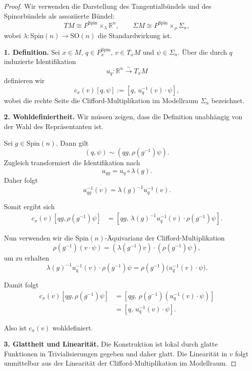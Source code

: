 \documentclass[10pt, letterpaper]{article}
\newcommand{\R}{\mathbb{R}}
\newcommand{\SO}{\mathrm{SO}}
\newcommand{\Spin}{\mathrm{Spin}}
\begin{document}
\begin{proof}
Wir verwenden die Darstellung des Tangentialbündels und des Spinorbündels als assoziierte Bündel:
\[
TM \cong P^{\Spin}\times_{\lambda} \R^n,
\qquad
\Sigma M \cong P^{\Spin}\times_{\rho} \Sigma_n,
\]
wobei $\lambda:\Spin(n)\to \SO(n)$ die Standardwirkung ist.

\medskip

\noindent
\textbf{1. Definition.}
Sei $x\in M$, $q\in P^{\Spin}_x$, $v\in T_xM$ und $\psi\in \Sigma_n$.
Über die durch $q$ induzierte Identifikation
\[
u_q:\R^n \xrightarrow{\sim} T_xM
\]
definieren wir
\[
c_x(v)[q,\psi] := [q,\,u_q^{-1}(v)\cdot \psi],
\]
wobei die rechte Seite die Clifford-Multiplikation im Modellraum $\Sigma_n$ bezeichnet.

\medskip

\noindent
\textbf{2. Wohldefiniertheit.}
Wir müssen zeigen, dass die Definition unabhängig von der Wahl des Repräsentanten ist.

Sei $g\in \Spin(n)$. Dann gilt
\[
(q,\psi) \sim (qg,\rho(g^{-1})\psi).
\]
Zugleich transformiert die Identifikation nach
\[
u_{qg} = u_q \circ \lambda(g).
\]
Daher folgt
\[
u_{qg}^{-1}(v) = \lambda(g)^{-1} u_q^{-1}(v).
\]

Somit ergibt sich
\[
\begin{aligned}
c_x(v)[qg,\rho(g^{-1})\psi]
&= [qg,\,\lambda(g)^{-1}u_q^{-1}(v)\cdot \rho(g^{-1})\psi].
\end{aligned}
\]

Nun verwenden wir die $\Spin(n)$-Äquivarianz der Clifford-Multiplikation
\[
\rho(g^{-1})(v\cdot \psi)
=
(\lambda(g^{-1})v)\cdot (\rho(g^{-1})\psi),
\]
um zu erhalten
\[
\lambda(g)^{-1}u_q^{-1}(v)\cdot \rho(g^{-1})\psi
=
\rho(g^{-1})\bigl(u_q^{-1}(v)\cdot \psi\bigr).
\]

Damit folgt
\[
\begin{aligned}
c_x(v)[qg,\rho(g^{-1})\psi]
&=
[qg,\,\rho(g^{-1})(u_q^{-1}(v)\cdot \psi)] \\
&=
[q,\,u_q^{-1}(v)\cdot \psi].
\end{aligned}
\]

Also ist $c_x(v)$ wohldefiniert.

\medskip

\noindent
\textbf{3. Glattheit und Linearität.}
Die Konstruktion ist lokal durch glatte Funktionen in Trivialisierungen gegeben und daher glatt.
Die Linearität in $v$ folgt unmittelbar aus der Linearität der Clifford-Multiplikation im Modellraum.

\medskip


\end{proof}
\end{document}
